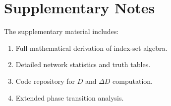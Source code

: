\documentclass[10pt, twocolumn]{article}
\begin{document}
\section*{Supplementary Notes}

The supplementary material includes:
\begin{enumerate}
    \item Full mathematical derivation of index-set algebra.
    \item Detailed network statistics and truth tables.
    \item Code repository for $D$ and $\Delta D$ computation.
    \item Extended phase transition analysis.
\end{enumerate}
\end{document}
